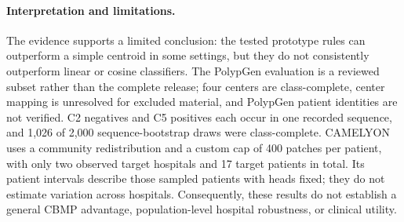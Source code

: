\paragraph{Interpretation and limitations.}
The evidence supports a limited conclusion: the tested prototype rules can outperform a simple centroid in some settings, but they do not consistently outperform linear or cosine classifiers. The PolypGen evaluation is a reviewed subset rather than the complete release; four centers are class-complete, center mapping is unresolved for excluded material, and PolypGen patient identities are not verified. C2 negatives and C5 positives each occur in one recorded sequence, and 1,026 of 2,000 sequence-bootstrap draws were class-complete. CAMELYON uses a community redistribution and a custom cap of 400 patches per patient, with only two observed target hospitals and 17 target patients in total. Its patient intervals describe those sampled patients with heads fixed; they do not estimate variation across hospitals. Consequently, these results do not establish a general CBMP advantage, population-level hospital robustness, or clinical utility.
